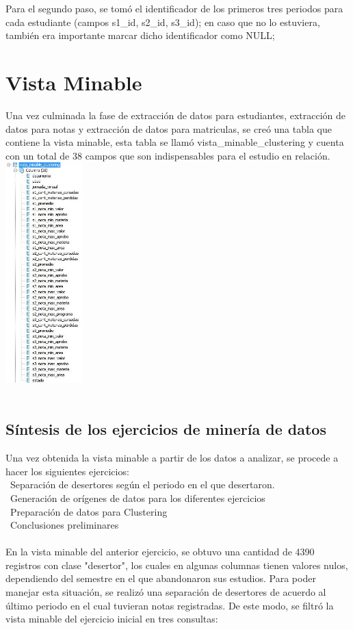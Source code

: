 \documentclass[fleqn,10pt]{SelfArx} %
\begin{document}
Para el segundo paso, se tomó el identificador de los primeros tres periodos para cada estudiante (campos s1\_id, s2\_id, s3\_id); en caso que no lo estuviera, también era importante marcar dicho identificador como NULL;

\section{Vista Minable}

Una vez culminada la fase de extracción de datos para estudiantes, extracción de datos para notas y extracción de datos para matriculas, se creó una tabla que contiene la vista minable, esta tabla se llamó vista\_minable\_clustering y cuenta con un total de 38 campos que son indispensables para el estudio en relación.\\

\includegraphics[width=3cm]{img/captura.jpg}\\ 
\\

\subsection{Síntesis de los ejercicios de minería de datos} 

Una vez obtenida la vista minable a partir de los datos a analizar, se procede a hacer los siguientes ejercicios:\\
\textbullet\ Separación de desertores según el periodo en el que desertaron.\\
\textbullet\ Generación de orígenes de datos para los diferentes ejercicios\\
\textbullet\ Preparación de datos para Clustering\\
\textbullet\ Conclusiones preliminares\\
\\
En la vista minable del anterior ejercicio, se obtuvo una cantidad de 4390 registros con clase "desertor", los cuales en algunas columnas tienen valores nulos, dependiendo del semestre en el que abandonaron sus estudios. Para poder manejar esta situación, se realizó una separación de desertores de acuerdo al último periodo en el cual tuvieran notas registradas. De este modo, se filtró la vista minable del ejercicio inicial en tres consultas:\\
\end{document}
